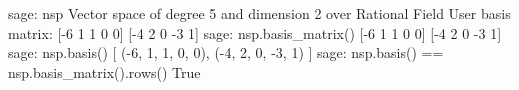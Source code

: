 %
\begin{sageexample}
sage: nsp
Vector space of degree 5 and dimension 2 over Rational Field
User basis matrix:
[-6  1  1  0  0]
[-4  2  0 -3  1]
sage: nsp.basis_matrix()
[-6  1  1  0  0]
[-4  2  0 -3  1]
sage: nsp.basis()
[
(-6, 1, 1, 0, 0),
(-4, 2, 0, -3, 1)
]
sage: nsp.basis() == nsp.basis_matrix().rows()
True
\end{sageexample}
%
\begin{sageverbatim}
\end{sageverbatim}
%


